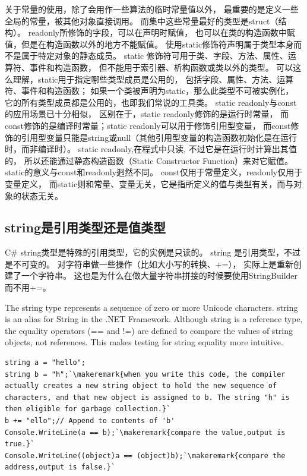 \documentclass{book}
\newcounter{coderemarks}   %
\newcommand{\circlemark}[1]{%
\tikz\node[text=white,font=\sffamily\bfseries,inner sep=0.2mm,draw,circle,fill=black]{#1};}
\newcommand{\makeremark}[1]{%
\circlemark{\arabic{coderemarks}}%
\global \expandafter\def \csname codebox\the\value{coderemarks}\endcsname{#1}%
\stepcounter{coderemarks}}
\begin{document}
关于常量的使用，除了会用作一些算法的临时常量值以外，
最重要的是定义一些全局的常量，被其他对象直接调用。
而集中这些常量最好的类型是struct（结构）。
readonly所修饰的字段，可以在声明时赋值，
也可以在类的构造函数中赋值，但是在构造函数以外的地方不能赋值。
使用static修饰符声明属于类型本身而不是属于特定对象的静态成员。
static 修饰符可用于类、字段、方法、属性、运算符、事件和构造函数，
但不能用于索引器、析构函数或类以外的类型。
可以这么理解，static用于指定哪些类型成员是公用的，
包括字段、属性、方法、运算符、事件和构造函数；
如果一个类被声明为static，那么此类型不可被实例化，
它的所有类型成员都是公用的，也即我们常说的工具类。
static readonly与const的应用场景已十分相似，
区别在于，static readonly修饰的是运行时常量，
而const修饰的是编译时常量；static readonly可以用于修饰引用型变量，
而const修饰的引用型变量只能是string或null（其他引用型变量的构造函数初始化是在运行时，而非编译时）。
static readonly,在程式中只读,
不过它是在运行时计算出其值的，
所以还能通过静态构造函数（Static Constructor Function）来对它赋值。
static的意义与const和readonly迥然不同。
const仅用于常量定义，readonly仅用于变量定义，
而static则和常量、变量无关，它是指所定义的值与类型有关，而与对象的状态无关。

\subsection{string是引用类型还是值类型}

C\# string类型是特殊的引用类型，它的实例是只读的。
string 是引用类型，不过是不可变的。
对字符串做一些操作（比如大小写的转换、+=），
实际上是重新创建了一个字符串。
这也是为什么在做大量字符串拼接的时候要使用StringBuilder 而不用+=。

The string type represents a sequence of zero or more Unicode characters. string is an alias for String in the .NET Framework.
Although string is a reference type, 
the equality operators (== and !=) are defined to compare the values of string objects, 
not references. This makes testing for string equality more intuitive. 

\begin{lstlisting}[language={[Sharp]C}]
string a = "hello";
string b = "h";`\makeremark{when you write this code, the compiler actually creates a new string object to hold the new sequence of characters, and that new object is assigned to b. The string "h" is then eligible for garbage collection.}`
b += "ello";// Append to contents of 'b'
Console.WriteLine(a == b);`\makeremark{compare the value,output is true.}`
Console.WriteLine((object)a == (object)b);`\makeremark{compare the address,output is false.}`
\end{lstlisting}
\end{document}
